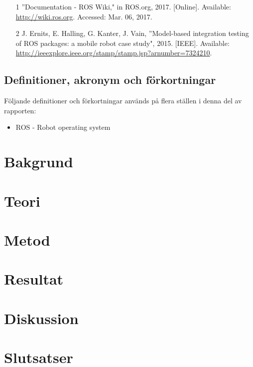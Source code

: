 \begin{itemize}
	\item [1] \textquotedblright Documentation - ROS Wiki," in ROS.org, 2017. [Online]. Available: \url{http://wiki.ros.org}. Accessed: Mar. 06, 2017.
	\item [2] J. Ernits, E. Halling, G. Kanter, J. Vain, \textquotedblright Model-based integration testing of ROS packages:
	a mobile robot case study", 2015. [IEEE]. Available: \url{http://ieeexplore.ieee.org/stamp/stamp.jsp?arnumber=7324210}.	
\end{itemize}

\subsection{Definitioner, akronym och förkortningar}

Följande definitioner och förkortningar används på flera ställen i denna del av rapporten:

\begin{itemize}
	\item ROS - Robot operating system
\end{itemize}

\section{Bakgrund}
\label{sec:background-holmberg}


\section{Teori}
\label{sec:theory-holmberg}


\section{Metod}
\label{sec:method-holmberg}


\section{Resultat}
\label{sec:results-holmberg}


\section{Diskussion}
\label{sec:discussion-holmberg}


\section{Slutsatser}
\label{sec:conclusions-holmberg}


